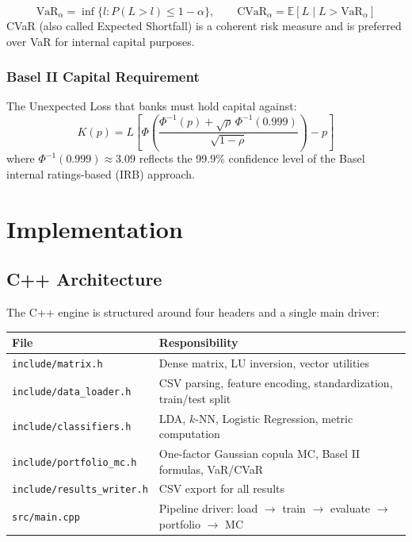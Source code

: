 \documentclass[12pt,a4paper]{article}
\begin{document}
\begin{equation}
  \text{VaR}_\alpha = \inf\{l : P(L > l) \leq 1-\alpha\}, \qquad
  \text{CVaR}_\alpha = \mathbb{E}[L \mid L > \text{VaR}_\alpha]
  \label{eq:var}
\end{equation}
CVaR (also called Expected Shortfall) is a coherent risk measure and is
preferred over VaR for internal capital purposes.

\subsubsection{Basel II Capital Requirement}

The Unexpected Loss that banks must hold capital against:
\begin{equation}
  K(p) = L\left[\Phi\!\left(\frac{\Phi^{-1}(p) + \sqrt{\rho}\,\Phi^{-1}(0.999)}{\sqrt{1-\rho}}\right) - p\right]
  \label{eq:basel}
\end{equation}
where $\Phi^{-1}(0.999) \approx 3.09$ reflects the 99.9\% confidence level of
the Basel internal ratings-based (IRB) approach.

\section{Implementation}

\subsection{C++ Architecture}

The C++ engine is structured around four headers and a single main driver:

\begin{center}
\renewcommand{\arraystretch}{1.3}
\begin{tabular}{@{}ll@{}}
\toprule
\textbf{File} & \textbf{Responsibility} \\
\midrule
\texttt{include/matrix.h}       & Dense matrix, LU inversion, vector utilities \\
\texttt{include/data\_loader.h} & CSV parsing, feature encoding, standardization, train/test split \\
\texttt{include/classifiers.h}  & LDA, $k$-NN, Logistic Regression, metric computation \\
\texttt{include/portfolio\_mc.h}& One-factor Gaussian copula MC, Basel II formulas, VaR/CVaR \\
\texttt{include/results\_writer.h}& CSV export for all results \\
\texttt{src/main.cpp}           & Pipeline driver: load $\to$ train $\to$ evaluate $\to$ portfolio $\to$ MC \\
\bottomrule
\end{tabular}
\end{center}
\end{document}
